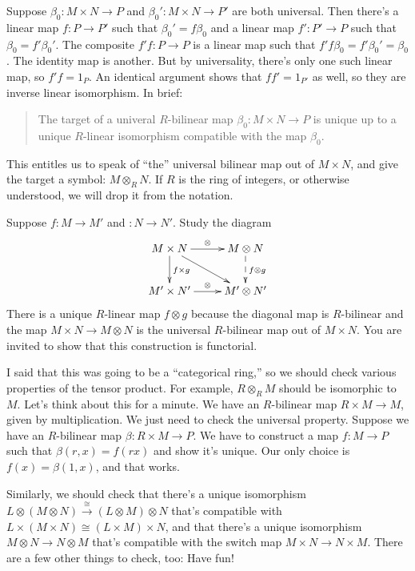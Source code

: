 \begin{property}[Uniqueness]
Suppose $\beta_0:M\times N\to P$ and $\beta_0':M\times N\to P'$ are both universal. Then there's a linear map $f:P\to P'$ such that $\beta_0'=f\beta_0$ and a linear map $f':P'\to P$ such that $\beta_0=f'\beta_0'$. 
The composite $f'f:P\to P$ is a linear map such that $f'f\beta_0=f'\beta_0'=\beta_0$. The identity map is another. But by universality, there's only one such linear map, so $f'f=1_P$. An identical argument shows that $ff'=1_{P'}$ as well, so they are inverse linear isomorphism. In brief: 
\begin{quote}
The target of a univeral $R$-bilinear map $\beta_0:M\times N\to P$ is unique up to a unique $R$-linear isomorphism compatible with the map $\beta_0$.
\end{quote}
This entitles us to speak of ``the'' universal bilinear map out of $M\times N$,
and give the target a symbol: $M\otimes_R N$. If $R$ is the ring of integers, or otherwise understood, we will drop it from the notation. 
\end{property}

\begin{property}[Functoriality] Suppose $f:M\to M'$ and $:N\to N'$. Study the diagram
\begin{equation*}
\xymatrix{M\times N\ar[d]^{f\times g}\ar[r]^\otimes\ar[dr] & M\otimes N\ar@{-->}[d]^{f\otimes g}\\
M^\prime\times N^\prime\ar[r]^\otimes & M^\prime\otimes N^\prime}
\end{equation*}
There is a unique $R$-linear map $f\otimes g$ because the diagonal map 
is $R$-bilinear and the map $M\times N\to M\otimes N$ is the universal
$R$-bilinear map out of $M\times N$. 
You are invited to show that this construction is functorial. 
\end{property}

\begin{property} 
I said that this was going to be a ``categorical ring,'' so we should check various properties of the tensor product. For example, $R\otimes_R M$ should be isomorphic to $M$. Let's think about this for a minute. We have an $R$-bilinear map $R\times M\to M$, given by multiplication. 
We just need to check the universal property. Suppose we have an $R$-bilinear map $\beta:R\times M\to P$. We have to construct a map $f:M\to P$ such that 
$\beta(r,x)=f(rx)$ and show it's unique. Our only choice is $f(x)=\beta(1,x)$,
and that works.

Similarly, we should check that there's a unique isomorphism $L\otimes(M\otimes N)\xrightarrow{\cong}(L\otimes M)\otimes N$ that's compatible with $L\times (M\times N)\cong (L\times M)\times N$, and that there's a unique isomorphism $M\otimes N\to N\otimes M$ that's compatible with the switch map $M\times N\to N\times M$. There are a few other things to check, too: Have fun!
\end{property}

